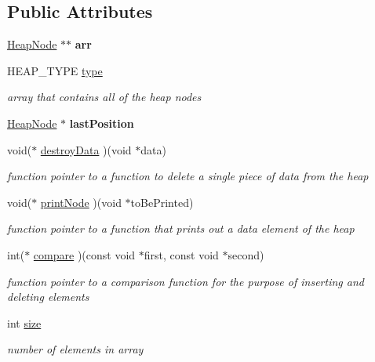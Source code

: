 \subsection*{Public Attributes}
\begin{DoxyCompactItemize}
\item 
\mbox{\label{structHeap_a0013c0d18ce0d0fe1d094b74abbe5a25}} 
\hyperlink{structNode}{Heap\+Node} $\ast$$\ast$ {\bfseries arr}
\item 
H\+E\+A\+P\+\_\+\+T\+Y\+PE \hyperlink{structHeap_a687e85d124c882bb01f5c9bf91171129}{type}
\begin{DoxyCompactList}\small\item\em array that contains all of the heap nodes \end{DoxyCompactList}\item 
\mbox{\label{structHeap_a81af51cefd33e58d5d284cc6d6617744}} 
\hyperlink{structNode}{Heap\+Node} $\ast$ {\bfseries last\+Position}
\item 
\mbox{\label{structHeap_abc8d0107b18de7599058485d78c2e244}} 
void($\ast$ \hyperlink{structHeap_abc8d0107b18de7599058485d78c2e244}{destroy\+Data} )(void $\ast$data)
\begin{DoxyCompactList}\small\item\em function pointer to a function to delete a single piece of data from the heap \end{DoxyCompactList}\item 
\mbox{\label{structHeap_a6f4d91e7eebe5e20d5ee60418c59c5e6}} 
void($\ast$ \hyperlink{structHeap_a6f4d91e7eebe5e20d5ee60418c59c5e6}{print\+Node} )(void $\ast$to\+Be\+Printed)
\begin{DoxyCompactList}\small\item\em function pointer to a function that prints out a data element of the heap \end{DoxyCompactList}\item 
\mbox{\label{structHeap_ab11468cee0bf82183a92cf2fa8bab107}} 
int($\ast$ \hyperlink{structHeap_ab11468cee0bf82183a92cf2fa8bab107}{compare} )(const void $\ast$first, const void $\ast$second)
\begin{DoxyCompactList}\small\item\em function pointer to a comparison function for the purpose of inserting and deleting elements \end{DoxyCompactList}\item 
\mbox{\label{structHeap_ac291cf589f86e95198621d33e21a05a6}} 
int \hyperlink{structHeap_ac291cf589f86e95198621d33e21a05a6}{size}
\begin{DoxyCompactList}\small\item\em number of elements in array \end{DoxyCompactList}\end{DoxyCompactItemize}


